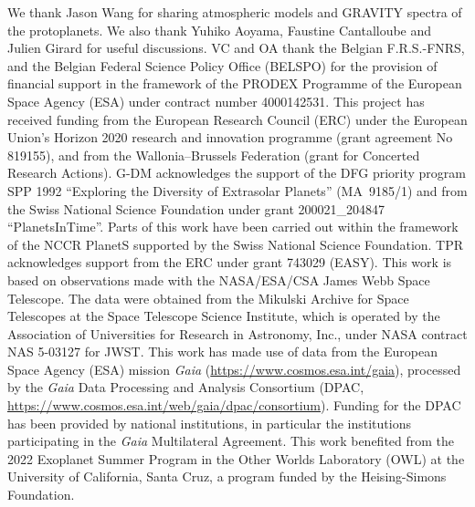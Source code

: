\documentclass[longauth]{aa}
\begin{document}
\begin{acknowledgements}
We thank Jason Wang for sharing atmospheric models and GRAVITY spectra of the protoplanets. We also thank Yuhiko Aoyama, Faustine Cantalloube and Julien Girard for useful discussions. VC and OA thank the Belgian F.R.S.-FNRS, and the Belgian Federal Science Policy Office (BELSPO) for the provision of financial support in the framework of the PRODEX Programme of the European Space Agency (ESA) under contract number 4000142531. This project has received funding from the European Research Council (ERC) under the European Union's Horizon 2020 research and innovation programme (grant agreement No 819155), and from the Wallonia--Brussels Federation (grant for Concerted Research Actions).
G-DM acknowledges the support of the DFG priority program SPP 1992 ``Exploring the Diversity of Extrasolar Planets'' (MA~9185/1) and from the Swiss National Science Foundation under grant
200021\_204847
``PlanetsInTime''. Parts of this work have been carried out within the framework of the NCCR PlanetS supported by the Swiss National Science Foundation.
TPR acknowledges support from the ERC under grant 743029 (EASY).
This work is based on observations made with the NASA/ESA/CSA James Webb Space Telescope. The data were obtained from the Mikulski Archive for Space Telescopes at the Space Telescope Science Institute, which is operated by the Association of Universities for Research in Astronomy, Inc., under NASA contract NAS 5-03127 for JWST. %
This work has made use of data from the European Space Agency (ESA) mission {\it Gaia} (\url{https://www.cosmos.esa.int/gaia}), processed by the {\it Gaia} Data Processing and Analysis Consortium (DPAC, \url{https://www.cosmos.esa.int/web/gaia/dpac/consortium}). Funding for the DPAC has been provided by national institutions, in particular the institutions participating in the {\it Gaia} Multilateral Agreement. 
This work benefited from the 2022 Exoplanet Summer Program in the Other
Worlds Laboratory (OWL) at the University of California, Santa Cruz, a program funded by the Heising-Simons Foundation.
\end{acknowledgements}
\end{document}
